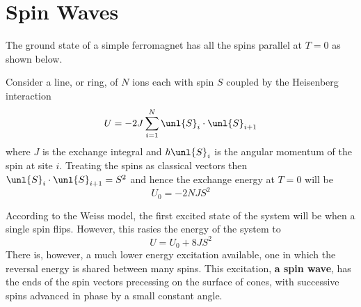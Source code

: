 \documentclass[a4paper, 11pt, normalem]{report}
\begin{document}
\section{Spin Waves}
The ground state of a simple ferromagnet has all the spins parallel at $T=0$ as shown below. 
\begin{figure}[H]
    \centering
\end{figure}
Consider a line, or ring, of $N$ ions each with spin $S$ coupled by the Heisenberg interaction
\begin{equation}
    U = -2J\sum_{i=1}^N \unl{S}_i\cdot \unl{S}_{i+1}
\end{equation}
where $J$ is the exchange integral and $\hbar\unl{S}_i$ is the angular momentum of the spin at site $i$.
Treating the spins as classical vectors then $\unl{S}_i\cdot\unl{S}_{i+1} = S^2$ and hence the exchange energy at $T=0$ will be 
\begin{equation}
    U_0 = -2NJS^2
\end{equation}
\begin{figure}[H]
    \centering
\end{figure}
According to the Weiss model, the first excited state of the system will be when a single spin flips. 
However, this rasies the energy of the system to
\begin{equation}
    U = U_0 + 8JS^2
\end{equation}
There is, however, a much lower energy excitation available, one in which the reversal energy is shared between many spins. 
This excitation, \textbf{a spin wave}, has the ends of the spin vectors precessing on the surface of cones, with successive spins advanced in phase by a small constant angle. 
\end{document}
